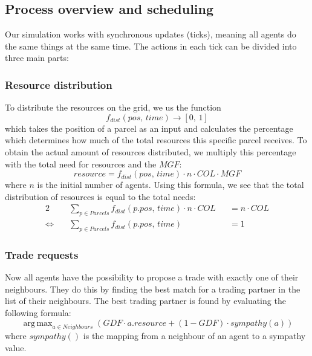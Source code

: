 \documentclass{JASSS}
\DeclareMathOperator*{\argmax}{arg\,max}
\newcommand{\gdf}{\mathit{GDF}}
\newcommand{\col}{\mathit{COL}}
\newcommand{\mgf}{\mathit{MGF}}
\begin{document}
\subsection{Process overview and scheduling}
Our simulation works with synchronous updates (ticks), meaning all agents do the same things at the same time. The actions in each tick can be divided into three main parts:
\subsubsection{Resource distribution}
	To distribute the resources on the grid, we us the function
	\begin{equation}
		f_\mathit{dist}(\mathit{pos},\, \mathit{time}) \to [0,\, 1]
	\end{equation}
	which takes the position of a parcel as an input and calculates the percentage which determines how much of the total resources this specific parcel receives. To obtain the actual amount of resources distributed, we multiply this percentage with the total need for resources and the $\mgf$:
	\begin{equation}
		resource = f_\mathit{dist}(\mathit{pos},\, \mathit{time}) \cdot n \cdot \col \cdot \mgf
	\end{equation}
	where $n$ is the initial number of agents. Using this formula, we see that the total distribution of resources is equal to the total needs:
	\begin{alignat}{2}
		&\sum_{p \in \mathit{Parcels}} f_\mathit{dist}(\mathit{p.pos},\, \mathit{time}) \cdot n \cdot \col &&= n \cdot \col\\
		\Longleftrightarrow \quad &\sum_{p \in \mathit{Parcels}} f_\mathit{dist}(\mathit{p.pos},\, \mathit{time}) &&= 1
	\end{alignat}
	
\subsubsection{Trade requests}
	Now all agents have the possibility to propose a trade with exactly one of their neighbours. They do this by finding the best match for a trading partner in the list of their neighbours. The best trading partner is found by evaluating the following formula:
	\begin{equation}
		\argmax_{a \in \mathit{Neighbours}} \left( \gdf \cdot a.\mathit{resource} + (1-\gdf) \cdot \mathit{sympathy}(a) \right)
	\end{equation}
	where $sympathy()$ is the mapping from a neighbour of an agent to a sympathy value.
	
\end{document}
